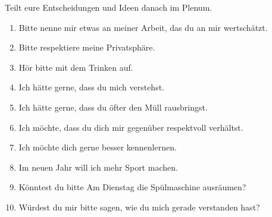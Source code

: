 Teilt eure Entscheidungen und Ideen danach im Plenum.


\begin{enumerate}
  \item Bitte nenne mir etwas an meiner Arbeit, das du an mir wertschätzt.
  \item Bitte respektiere meine Privatsphäre.
  \item Hör bitte mit dem Trinken auf.
  \item Ich hätte gerne, dass du mich verstehst.
  \item Ich hätte gerne, dass du öfter den Müll rausbringst.
  \item Ich möchte, dass du dich mir gegenüber respektvoll verhältst.
  \item Ich möchte dich gerne besser kennenlernen.
  \item Im neuen Jahr will ich mehr Sport machen.
  \item Könntest du bitte Am Dienstag die Spülmaschine ausräumen?
  \item Würdest du mir bitte sagen, wie du mich gerade verstanden hast?
\end{enumerate}
